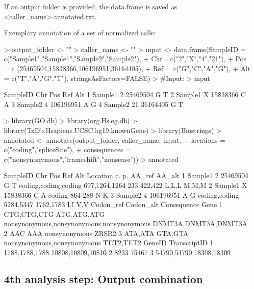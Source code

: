 \documentclass{article}
\begin{document}
If an output folder is provided, the data.frame is saved as <caller\_name>.annotated.txt.

Exemplary annotation of a set of normalized calls:

\begin{Schunk}
\begin{Sinput}
> output_folder <- ""
> caller_name <- ""
> input <- data.frame(SampleID = c("Sample1","Sample1","Sample2","Sample2"),
+                     Chr =c("2","X","4","21"),
+                     Pos = c (25469504,15838366,106196951,36164405),
+                     Ref = c("G","C","A","G"),
+                     Alt = c("T","A","G","T"), stringsAsFactors=FALSE)
> #Input:
> input
\end{Sinput}
\begin{Soutput}
  SampleID Chr       Pos Ref Alt
1  Sample1   2  25469504   G   T
2  Sample1   X  15838366   C   A
3  Sample2   4 106196951   A   G
4  Sample2  21  36164405   G   T
\end{Soutput}
\begin{Sinput}
> library(GO.db)
> library(org.Hs.eg.db)
> library(TxDb.Hsapiens.UCSC.hg19.knownGene)
> library(Biostrings)
> annotated <- annotate(output_folder, caller_name, input,
+              locations = c("coding","spliceSite"),
+              consequences = c("nonsynonymous","frameshift","nonsense"))
> annotated
\end{Sinput}
\begin{Soutput}
  SampleID Chr       Pos Ref Alt             Location            c.          p. AA_ref AA_alt
1  Sample1   2  25469504   G   T coding,coding,coding 697,1264,1264 233,422,422  L,L,L  M,M,M
2  Sample1   X  15838366   C   A               coding           864         288      N      K
3  Sample2   4 106196951   A   G        coding,coding     5284,5347   1762,1783    I,I    V,V
    Codon_ref   Codon_alt                               Consequence                 Gene
1 CTG,CTG,CTG ATG,ATG,ATG nonsynonymous,nonsynonymous,nonsynonymous DNMT3A,DNMT3A,DNMT3A
2         AAC         AAA                             nonsynonymous                ZRSR2
3     ATA,ATA     GTA,GTA               nonsynonymous,nonsynonymous            TET2,TET2
          GeneID      TranscriptID
1 1788,1788,1788 10808,10809,10810
2           8233             75467
3    54790,54790       18308,18309
\end{Soutput}
\end{Schunk}

\subsection{4th analysis step: Output combination}
\end{document}

